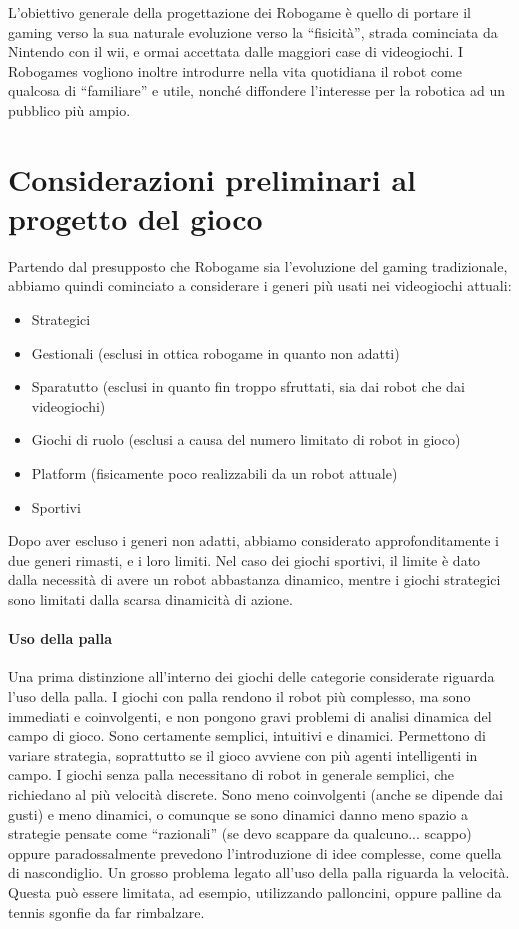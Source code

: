 L'obiettivo generale della progettazione dei Robogame è quello di portare il gaming verso la sua naturale evoluzione verso la ``fisicità'', strada cominciata da Nintendo con il wii, e ormai accettata dalle maggiori case di videogiochi. I Robogames vogliono inoltre introdurre nella vita quotidiana il robot come qualcosa di ``familiare'' e utile, nonché diffondere l'interesse per la robotica ad un pubblico più ampio.

\section{Considerazioni preliminari al progetto del gioco}
Partendo dal presupposto che Robogame sia l’evoluzione del gaming tradizionale, abbiamo quindi cominciato a considerare i generi più usati nei videogiochi attuali:
\begin{itemize}
\item Strategici
\item Gestionali (esclusi in ottica robogame in quanto non adatti)
\item Sparatutto (esclusi in quanto fin troppo sfruttati, sia dai robot che dai videogiochi)
\item Giochi di ruolo (esclusi a causa del numero limitato di robot in gioco)
\item Platform (fisicamente poco realizzabili da un robot attuale)
\item Sportivi
\end{itemize}
Dopo aver escluso i generi non adatti, abbiamo considerato approfonditamente i due generi rimasti, e i loro limiti. Nel caso dei giochi sportivi, il limite è dato dalla necessità di avere un robot abbastanza dinamico, mentre i giochi strategici sono limitati dalla scarsa dinamicità di azione.

\paragraph{Uso della palla} Una prima distinzione all'interno dei giochi delle categorie considerate riguarda l'uso della palla. 
I giochi con palla rendono il robot più complesso, ma sono immediati e coinvolgenti, e non pongono gravi problemi di analisi dinamica del campo di gioco. Sono certamente semplici, intuitivi e dinamici. Permettono di variare strategia, soprattutto se il gioco avviene con più agenti intelligenti in campo.
I giochi senza palla necessitano di robot in generale semplici, che richiedano al più velocità discrete. Sono meno coinvolgenti (anche se dipende dai gusti) e meno dinamici, o comunque se sono dinamici danno meno spazio a strategie pensate come ``razionali'' (se devo scappare da qualcuno... scappo) oppure paradossalmente prevedono l'introduzione di idee complesse, come quella di nascondiglio.
Un grosso problema legato all'uso della palla riguarda la velocità. Questa può essere limitata, ad esempio, utilizzando palloncini, oppure palline da tennis sgonfie da far rimbalzare.

